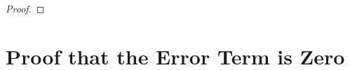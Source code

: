 \documentclass[honours]{UNSWthesis}
\newcommand{\1}{\mathbf{e}_{1}}
\newcommand{\2}{\mathbf{e}_{3}}
\newcommand{\3}{\mathbf{e}_{3}}
\begin{document}
\begin{proof}
\end{proof}

\section{Proof that the Error Term is Zero}




\end{document}
